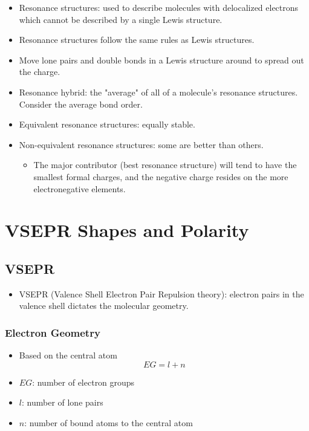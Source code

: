 \documentclass{article}
\begin{document}
\begin{itemize}
    \item Resonance structures: used to describe molecules with delocalized electrons which cannot be described by a single Lewis structure.
    \item Resonance structures follow the same rules as Lewis structures.
    \item Move lone pairs and double bonds in a Lewis structure around to spread out the charge.
    \item Resonance hybrid: the "average" of all of a molecule's resonance structures. Consider the average bond order.
    \item Equivalent resonance structures: equally stable.
    \item Non-equivalent resonance structures: some are better than others.
    \begin{itemize}
        \item The major contributor (best resonance structure) will tend to have the smallest formal charges, and the negative charge resides on the more electronegative elements.
    \end{itemize}
\end{itemize}

\section{VSEPR Shapes and Polarity}

\subsection{VSEPR}

\begin{itemize}
    \item VSEPR (Valence Shell Electron Pair Repulsion theory): electron pairs in the valence shell dictates the molecular geometry.
\end{itemize}

\subsubsection{Electron Geometry}

\begin{itemize}
    \item Based on the central atom
\[EG = l + n\]
    \item $EG$: number of electron groups
    \item $l$: number of lone pairs 
    \item $n$: number of bound atoms to the central atom
\end{itemize}
\end{document}
